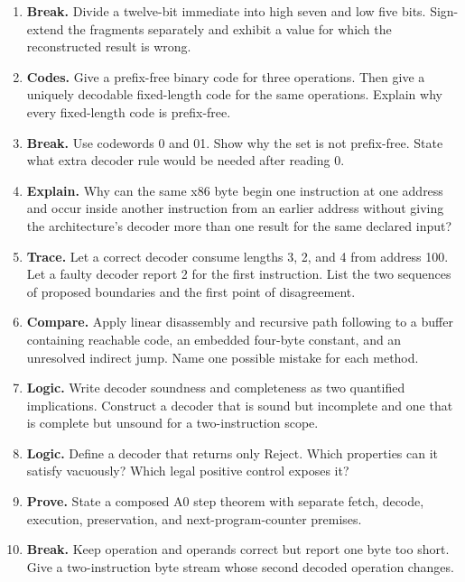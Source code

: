 \begin{enumerate}
\item \textbf{Break.} Divide a twelve-bit immediate into high seven and low
five bits. Sign-extend the fragments separately and exhibit a value for which
the reconstructed result is wrong.

\item \textbf{Codes.} Give a prefix-free binary code for three operations.
Then give a uniquely decodable fixed-length code for the same operations.
Explain why every fixed-length code is prefix-free.

\item \textbf{Break.} Use codewords 0 and 01. Show why the set is not
prefix-free. State what extra decoder rule would be needed after reading 0.

\item \textbf{Explain.} Why can the same x86 byte begin one instruction at one
address and occur inside another instruction from an earlier address without
giving the architecture's decoder more than one result for the same declared
input?

\item \textbf{Trace.} Let a correct decoder consume lengths 3, 2, and 4 from
address 100. Let a faulty decoder report 2 for the first instruction. List the
two sequences of proposed boundaries and the first point of disagreement.

\item \textbf{Compare.} Apply linear disassembly and recursive path following to a
buffer containing reachable code, an embedded four-byte constant, and an
unresolved indirect jump. Name one possible mistake for each method.

\item \textbf{Logic.} Write decoder soundness and completeness as two
quantified implications. Construct a decoder that is sound but incomplete and
one that is complete but unsound for a two-instruction scope.

\item \textbf{Logic.} Define a decoder that returns only Reject. Which
properties can it satisfy vacuously? Which legal positive control exposes it?

\item \textbf{Prove.} State a composed A0 step theorem with separate fetch,
decode, execution, preservation, and next-program-counter premises.

\item \textbf{Break.} Keep operation and operands correct but report one byte
too short. Give a two-instruction byte stream whose second decoded operation
changes.


\end{enumerate}
